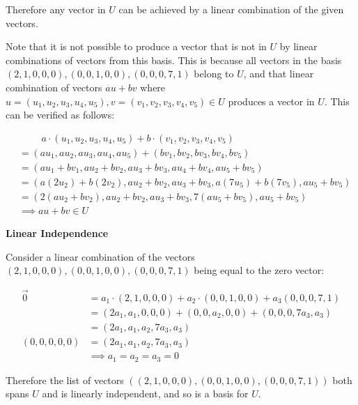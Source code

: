 \documentclass{article}
\begin{document}
Therefore any vector in $U$ can be achieved by a linear combination of the given vectors.

Note that it is not possible to produce a vector that is not in $U$ by linear combinations of vectors from this basis. This is because all vectors in the basis $(2, 1, 0, 0, 0), (0, 0, 1, 0, 0), (0, 0, 0, 7, 1)$ belong to $U$, and that linear combination of vectors $a u + b v$ where $u = (u_1, u_2, u_3, u_4, u_5), v = (v_1, v_2, v_3, v_4, v_5) \in U$ produces a vector in $U$. This can be verified as follows:

\begin{align*}
     & \phantom{=\quad} a \cdot (u_1, u_2, u_3, u_4, u_5) + b \cdot (v_1, v_2, v_3, v_4, v_5) \\
     & = (au_1, au_2, au_3, au_4, au_5) + (bv_1, bv_2, bv_3, bv_4, bv_5)                      \\
     & = (au_1 + bv_1, au_2 + bv_2, au_3 +  bv_3, au_4 + bv_4, au_5 + bv_5)                   \\
     & = (a(2u_2) + b(2v_2), au_2 + bv_2, au_3 +  bv_3, a(7u_5) + b(7v_5), au_5 + bv_5)       \\
     & = (2(au_2 + bv_2), au_2 + bv_2, au_3 +  bv_3, 7(au_5 + bv_5), au_5 + bv_5)             \\
     & \implies au + bv \in U
\end{align*}

\textbf{Linear Independence}

Consider a linear combination of the vectors $(2, 1, 0, 0, 0), (0, 0, 1, 0, 0), (0, 0, 0, 7, 1)$ being equal to the zero vector:

\begin{align*}
    \vec{0}         & = a_1 \cdot (2, 1, 0, 0, 0) + a_2 \cdot (0, 0, 1, 0, 0) + a_3 (0, 0, 0, 7, 1) \\
                    & = (2a_1, a_1, 0, 0, 0) + (0, 0, a_2, 0, 0) + (0, 0, 0, 7a_3, a_3)             \\
                    & = (2a_1, a_1, a_2, 7a_3, a_3)                                                 \\
    (0, 0, 0, 0, 0) & = (2a_1, a_1, a_2, 7a_3, a_3)                                                 \\[1em]
                    & \implies a_1 = a_2 = a_3 = 0
\end{align*}

Therefore the list of vectors $((2, 1, 0, 0, 0), (0, 0, 1, 0, 0), (0, 0, 0, 7, 1))$ both spans $U$ and is linearly independent, and so is a basis for $U$.
\end{document}
